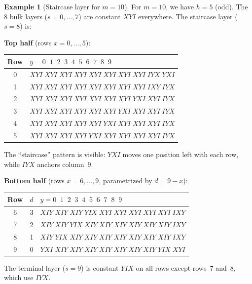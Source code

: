 \documentclass[11pt]{article}
\theoremstyle{definition}
\newtheorem{example}[theorem]{Example}
\theoremstyle{remark}
\begin{document}
\begin{example}[Staircase layer for $m = 10$]
\label{ex:staircase10}
For $m = 10$, we have $h = 5$ (odd). The 8 bulk layers ($s = 0, \ldots, 7$) are constant $XYI$ everywhere. The staircase layer ($s = 8$) is:

\medskip
\noindent\textbf{Top half} (rows $x = 0, \ldots, 5$):
\begin{center}
\small
\begin{tabular}{@{}cl@{}}
\toprule
Row & $y = 0 \;\; 1 \;\; 2 \;\; 3 \;\; 4 \;\; 5 \;\; 6 \;\; 7 \;\; 8 \;\; 9$ \\
\midrule
0 & $XYI \; XYI \; XYI \; XYI \; XYI \; XYI \; XYI \; XYI \; IYX \; YXI$ \\
1 & $XYI \; XYI \; XYI \; XYI \; XYI \; XYI \; XYI \; XYI \; IXY \; IYX$ \\
2 & $XYI \; XYI \; XYI \; XYI \; XYI \; XYI \; XYI \; YXI \; XYI \; IYX$ \\
3 & $XYI \; XYI \; XYI \; XYI \; XYI \; XYI \; YXI \; XYI \; XYI \; IYX$ \\
4 & $XYI \; XYI \; XYI \; XYI \; XYI \; YXI \; XYI \; XYI \; XYI \; IYX$ \\
5 & $XYI \; XYI \; XYI \; XYI \; YXI \; XYI \; XYI \; XYI \; XYI \; IYX$ \\
\bottomrule
\end{tabular}
\end{center}

\noindent The ``staircase'' pattern is visible: $YXI$ moves one position left with each row, while $IYX$ anchors column~$9$.

\medskip
\noindent\textbf{Bottom half} (rows $x = 6, \ldots, 9$, parametrized by $d = 9 - x$):
\begin{center}
\small
\begin{tabular}{@{}ccl@{}}
\toprule
Row & $d$ & $y = 0 \;\; 1 \;\; 2 \;\; 3 \;\; 4 \;\; 5 \;\; 6 \;\; 7 \;\; 8 \;\; 9$ \\
\midrule
6 & 3 & $XIY \; XIY \; XIY \; YIX \; XYI \; XYI \; XYI \; XYI \; XYI \; IXY$ \\
7 & 2 & $XIY \; XIY \; YIX \; XIY \; XIY \; XIY \; XIY \; XIY \; XIY \; IXY$ \\
8 & 1 & $XIY \; YIX \; XIY \; XIY \; XIY \; XIY \; XIY \; XIY \; XIY \; IXY$ \\
9 & 0 & $YXI \; XIY \; XIY \; XIY \; XIY \; XIY \; XIY \; XIY \; YIX \; XYI$ \\
\bottomrule
\end{tabular}
\end{center}

\noindent The terminal layer ($s = 9$) is constant $YIX$ on all rows except rows~$7$ and~$8$, which use $IYX$.
\end{example}
\end{document}
